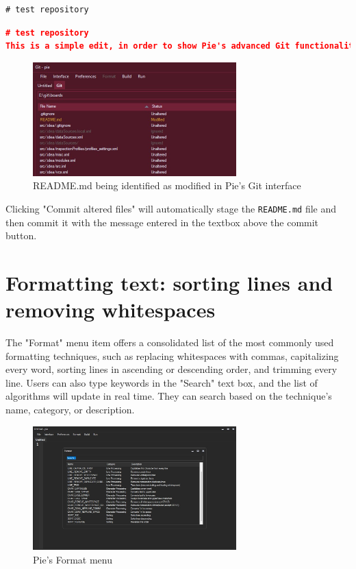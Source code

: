 \begin{lstlisting}[caption={Content of the README.md file before edit}]
# test repository
\end{lstlisting}

\begin{lstlisting}[language=json, caption={Content of the README.md file after edit}]
# test repository
This is a simple edit, in order to show Pie's advanced Git functionalities
\end{lstlisting}

\begin{figure}[H]
\centering
\includegraphics[width=0.7\textwidth]{images/pie-readme-git.jpg}
\caption{README.md being identified as modified in Pie's Git interface}
\label{fig:fig2,1.}
\end{figure}

Clicking "Commit altered files" will automatically stage the \texttt{README.md} file and then commit it with the message entered in the textbox above the commit button.

\section{Formatting text: sorting lines and removing whitespaces}

The "Format" menu item offers a consolidated list of the most commonly used formatting techniques, such as replacing whitespaces with commas, capitalizing every word, sorting lines in ascending or descending order, and trimming every line. Users can also type keywords in the "Search" text box, and the list of algorithms will update in real time. They can search based on the technique's name, category, or description.

\begin{figure}[H]
\centering
\includegraphics[width=0.7\textwidth]{images/format-menu.jpg}
\caption{Pie's Format menu}
\label{fig:fig2,1.}
\end{figure}

